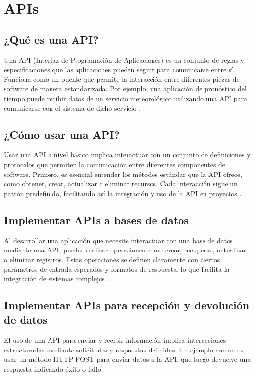 \section{APIs}
\subsection{¿Qué es una API?}
Una API (Interfaz de Programación de Aplicaciones) es un conjunto de reglas y especificaciones que las aplicaciones pueden seguir para comunicarse entre sí. Funciona como un puente que permite la interacción entre diferentes piezas de software de manera estandarizada. Por ejemplo, una aplicación de pronóstico del tiempo puede recibir datos de un servicio meteorológico utilizando una API para comunicarse con el sistema de dicho servicio \cite{API}.

\subsection{¿Cómo usar una API?}
Usar una API a nivel básico implica interactuar con un conjunto de definiciones y protocolos que permiten la comunicación entre diferentes componentes de software. Primero, es esencial entender los métodos estándar que la API ofrece, como obtener, crear, actualizar o eliminar recursos. Cada interacción sigue un patrón predefinido, facilitando así la integración y uso de la API en proyectos \cite{UsoAPI}.

\subsection{Implementar APIs a bases de datos}
Al desarrollar una aplicación que necesite interactuar con una base de datos mediante una API, puedes realizar operaciones como crear, recuperar, actualizar o eliminar registros. Estas operaciones se definen claramente con ciertos parámetros de entrada esperados y formatos de respuesta, lo que facilita la integración de sistemas complejos \cite{ImplementarAPI}.

\subsection{Implementar APIs para recepción y devolución de datos}
El uso de una API para enviar y recibir información implica interacciones estructuradas mediante solicitudes y respuestas definidas. Un ejemplo común es usar un método HTTP POST para enviar datos a la API, que luego devuelve una respuesta indicando éxito o fallo \cite{ImplementarAPIDatos}.

